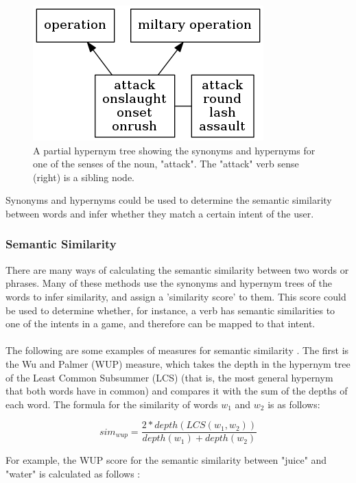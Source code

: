 \documentclass[11pt]{article}
\begin{document}
\begin{center}
\begin{figure}[H]
\begin{center}
  \includegraphics[scale=1]{hypernym-tree.png}
  \caption{A partial hypernym tree showing the synonyms and hypernyms for one of the senses of the noun, "attack". The "attack" verb sense (right) is a sibling node.}
  \end{center}
\end{figure}
\end{center}

Synonyms and hypernyms could be used to determine the semantic similarity between words and infer whether they match a certain intent of the user.

\subsubsection{Semantic Similarity}

There are many ways of calculating the semantic similarity between two words or phrases. Many of these methods use the synonyms and hypernym trees of the words to infer similarity, and assign a 'similarity score' to them. This score could be used to determine whether, for instance, a verb has semantic similarities to one of the intents in a game, and therefore can be mapped to that intent.
\\
\\
The following are some examples of measures for semantic similarity \cite{RefWorks:46}. The first is the Wu and Palmer (WUP) measure, which takes the depth in the hypernym tree of the Least Common Subsummer (LCS) (that is, the most general hypernym that both words have in common) and compares it with the sum of the depths of each word. The formula for the similarity of words $w_1$ and $w_2$ is as follows:

$$sim_{wup} = \frac{2*depth(LCS(w_1,w_2))}{depth(w_1)+depth(w_2)}$$

For example, the WUP score for the semantic similarity between "juice" and "water" is calculated as follows \cite{RefWorks:49}:
\end{document}
